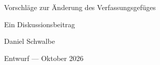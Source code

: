 \documentclass[a4paper, 12pt, numbers=noenddot, parskip=half]{scrartcl}
\begin{document}
\begin{titlepage}
  \centering
  \vspace*{6cm}
  {\LARGE Vorschläge zur Änderung des Verfassungsgefüges\par}
  \vspace{2cm}
  {\normalsize Ein Diskussionsbeitrag\par}
  \vspace{1cm}
  {\normalsize Daniel Schwalbe\par}
  \vspace{1cm}
  {\normalsize Entwurf --- Oktober 2026\par}
  \vfill
\end{titlepage}

\tableofcontents
\newpage


\end{document}
